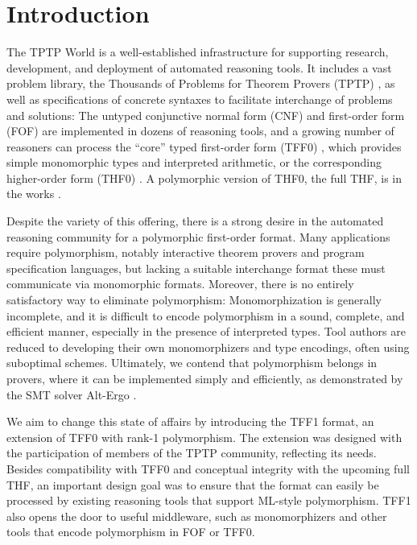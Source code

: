 \section{Introduction}
\label{sec_intro}

The TPTP World \cite{sutcliffe-2010-world} is a well-established infrastructure
for supporting research, development, and deployment of automated reasoning
tools. It includes a vast problem library, the Thousands of Problems for Theorem
Provers (TPTP) \cite{sutcliffe-2009-lib}, as well as specifications of concrete
syntaxes to facilitate interchange of problems and solutions: The untyped
conjunctive normal form (CNF) and first-order form (FOF) are implemented in
dozens of reasoning tools, and a growing number of reasoners can process the
``core'' typed first-order form (TFF0) \cite{sutcliffe-et-al-2012-tff0},
which provides simple monomorphic types and interpreted arithmetic,
or the corresponding higher-order form (THF0) \cite{benzmueller-et-al-2008-thf0}.
A polymorphic version of THF0, the full THF, is in the works
\cite{sutcliffe-benzmueller-2010}.

Despite the variety of this offering, there is a strong desire in the automated
reasoning community for a polymorphic first-order format. Many applications
require polymorphism, notably interactive theorem provers and program
specification languages, but lacking a suitable interchange format these
must communicate via monomorphic formats. Moreover, there is no entirely
satisfactory way to eliminate polymorphism: Monomorphization is generally
incomplete, and it is difficult to encode polymorphism in a sound, complete, and
efficient manner, especially in the presence of interpreted types. Tool authors
are reduced to developing their own monomorphizers and type encodings, often
using suboptimal schemes. Ultimately, we contend that polymorphism belongs in
provers, where it can be implemented simply and efficiently, as demonstrated by
the SMT solver Alt-Ergo \cite{bobot-et-al-2008}.

We aim to change this state of affairs by introducing the TFF1
format, an extension of TFF0 with rank-1 polymorphism. The
extension was designed with the participation of members of the TPTP community,
reflecting its needs.
Besides compatibility with TFF0 and conceptual integrity with the upcoming full
THF, an important design goal was to ensure that the format can easily be
processed by existing reasoning tools that support ML-style polymorphism. TFF1
also opens the door to useful middleware, such as monomorphizers and other
tools that encode polymorphism in FOF or TFF0.

